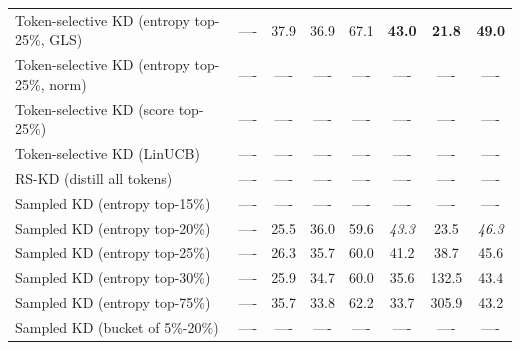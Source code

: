 \documentclass[11pt]{article}
\begin{document}
\begin{table}[t]
{\begin{tabular}{lccccccc}
		Token-selective KD (entropy top-25\%, GLS) & ----    & 37.9                  & 36.9                      & 67.1                 & \textbf{43.0}               & \textbf{21.8}           & \textbf{49.0} \\
		Token-selective KD (entropy top-25\%, norm)& ----    & ----                  & ----                      & ----                 & ----                        & ----                    & ----          \\
		Token-selective KD (score top-25\%)        & ----    & ----                  & ----                      & ----                 & ----                        & ----                    & ----          \\
		Token-selective KD (LinUCB)			       & ----    & ----                  & ----                      & ----                 & ----                        & ----                    & ----          \\
   		\midrule
   		RS-KD (distill all tokens)	               & ----    & ----                  & ----                      & ----                 & ----                        & ----                    & ----          \\
		Sampled KD (entropy top-15\%)              & ----    & ----                  & ----                      & ----                 & ----                        & ----                    & ----          \\
		Sampled KD (entropy top-20\%)              & ----    & 25.5                  & 36.0                      & 59.6                 & \textit{43.3}               & 23.5                    & \textit{46.3} \\
		Sampled KD (entropy top-25\%)              & ----    & 26.3                  & 35.7                      & 60.0                 & 41.2                        & 38.7                    & 45.6          \\
		Sampled KD (entropy top-30\%)              & ----    & 25.9                  & 34.7                      & 60.0                 & 35.6                        & 132.5                   & 43.4          \\
		Sampled KD (entropy top-75\%)              & ----    & 35.7                  & 33.8                      & 62.2                 & 33.7                        & 305.9                   & 43.2          \\
		Sampled KD (bucket of 5\%-20\%)  		   & ----    & ----                  & ----                      & ----                 & ----                        & ----                    & ----          \\

\end{tabular}}
\end{table}
\end{document}
